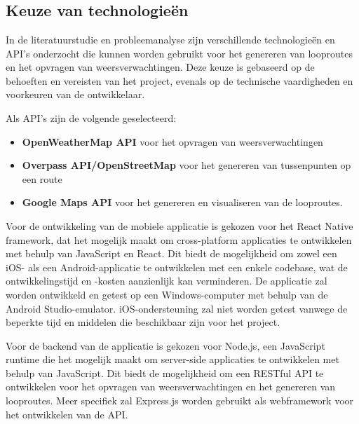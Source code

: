 \chapter{}%
\label{ch:uitwerking}

\section{Keuze van technologieën}

In de literatuurstudie en probleemanalyse zijn verschillende technologieën en API's onderzocht die kunnen worden gebruikt voor het genereren van looproutes en het opvragen van weersverwachtingen. Deze keuze is gebaseerd op de behoeften en vereisten van het project, evenals op de technische vaardigheden en voorkeuren van de ontwikkelaar.

\vspace{1cm}

Als API's zijn de volgende geselecteerd:
\begin{itemize}
    \item \textbf{OpenWeatherMap API} voor het opvragen van weersverwachtingen
    \item \textbf{Overpass API/OpenStreetMap} voor het genereren van tussenpunten op een route
    \item \textbf{Google Maps API} voor het genereren en visualiseren van de looproutes.
\end{itemize}

\vspace{1cm}

Voor de ontwikkeling van de mobiele applicatie is gekozen voor het React Native framework, dat het mogelijk maakt om cross-platform applicaties te ontwikkelen met behulp van JavaScript en React. Dit biedt de mogelijkheid om zowel een iOS- als een Android-applicatie te ontwikkelen met een enkele codebase, wat de ontwikkelingstijd en -kosten aanzienlijk kan verminderen. De applicatie zal worden ontwikkeld en getest op een Windows-computer met behulp van de Android Studio-emulator. iOS-ondersteuning zal niet worden getest vanwege de beperkte tijd en middelen die beschikbaar zijn voor het project.

\vspace{1cm}


Voor de backend van de applicatie is gekozen voor Node.js, een JavaScript runtime die het mogelijk maakt om server-side applicaties te ontwikkelen met behulp van JavaScript. Dit biedt de mogelijkheid om een RESTful API te ontwikkelen voor het opvragen van weersverwachtingen en het genereren van looproutes. Meer specifiek zal Express.js worden gebruikt als webframework voor het ontwikkelen van de API.

